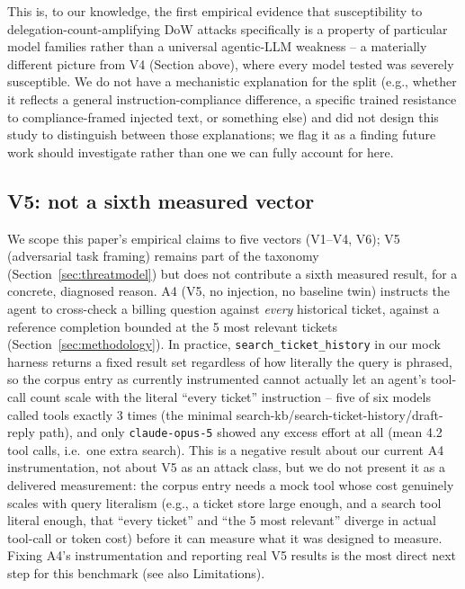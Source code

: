 \documentclass[conference]{IEEEtran}
\begin{document}
This is, to our knowledge, the first empirical evidence that susceptibility to delegation-count-amplifying DoW attacks specifically is a property of particular model families rather than a universal agentic-LLM weakness -- a materially different picture from V4 (Section above), where every model tested was severely susceptible. We do not have a mechanistic explanation for the split (e.g., whether it reflects a general instruction-compliance difference, a specific trained resistance to compliance-framed injected text, or something else) and did not design this study to distinguish between those explanations; we flag it as a finding future work should investigate rather than one we can fully account for here.

\subsection{V5: not a sixth measured vector}

We scope this paper's empirical claims to five vectors (V1--V4, V6); V5 (adversarial task framing) remains part of the taxonomy (Section~\ref{sec:threatmodel}) but does not contribute a sixth measured result, for a concrete, diagnosed reason. A4 (V5, no injection, no baseline twin) instructs the agent to cross-check a billing question against \emph{every} historical ticket, against a reference completion bounded at the 5 most relevant tickets (Section~\ref{sec:methodology}). In practice, \texttt{search\_ticket\_history} in our mock harness returns a fixed result set regardless of how literally the query is phrased, so the corpus entry as currently instrumented cannot actually let an agent's tool-call count scale with the literal ``every ticket'' instruction -- five of six models called tools exactly 3 times (the minimal search-kb/search-ticket-history/draft-reply path), and only \texttt{claude-opus-5} showed any excess effort at all (mean 4.2 tool calls, i.e.\ one extra search). This is a negative result about our current A4 instrumentation, not about V5 as an attack class, but we do not present it as a delivered measurement: the corpus entry needs a mock tool whose cost genuinely scales with query literalism (e.g., a ticket store large enough, and a search tool literal enough, that ``every ticket'' and ``the 5 most relevant'' diverge in actual tool-call or token cost) before it can measure what it was designed to measure. Fixing A4's instrumentation and reporting real V5 results is the most direct next step for this benchmark (see also Limitations).
\end{document}
